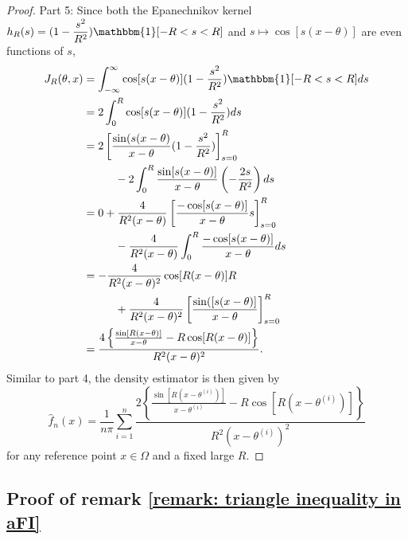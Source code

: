 \documentclass[%
 reprint,
 amsmath,amssymb,
 aps,
]{revtex4-2}
\begin{document}
\begin{proof}
    Part 5: Since both the Epanechnikov kernel $\displaystyle h_R(s) = (1 - \frac{s^2}{R^2}) \mathbbm{1}[-R < s < R]$ and $s \mapsto \cos[s(x - \theta)]$ are even functions of $s$,
    \begin{align*}
        J_R(\theta, x) & = \int_{-\infty}^\infty \cos[s(x - \theta)](1 - \frac{s^2}{R^2}) \mathbbm{1}[-R < s < R]ds \\
        & = 2 \int_0^R \cos[s(x - \theta)](1 - \frac{s^2}{R^2}) ds \\
        & = 2\left[\frac{\sin(s(x - \theta)}{x - \theta}(1 - \frac{s^2}{R^2}) \right]^R_{s = 0} \\
        & \hspace{1cm} -2\int_0^R \frac{\sin[s(x - \theta)]}{x - \theta}\left(-\frac{2s}{R^2} \right) ds \\
        & = 0 + \frac{4}{R^2(x - \theta)} \left[\frac{-\cos[s(x - \theta)]}{x - \theta}s \right]^R_{s = 0} \\
        & \hspace{1cm} - \frac{4}{R^2(x - \theta)} \int_0^R \frac{-\cos[s(x - \theta)]}{x - \theta} ds \\
        & = -\frac{4}{R^2(x - \theta)^2}\cos[R(x - \theta)]R \\
        & \hspace{1cm} + \frac{4}{R^2(x - \theta)^2}\left[\frac{\sin([s(x - \theta)]}{x - \theta} \right]^R_{s = 0} \\
        & = \frac{4\left\{\frac{\sin[R(x - \theta)]}{x - \theta} - R\cos[R(x - \theta)] \right\}}{R^2(x - \theta)^2}.
    \end{align*}
    Similar to part 4, the density estimator is then given by
    \begin{equation*}
        \hat{f}_n(x) = \frac{1}{n\pi} \sum_{i = 1}^n \frac{2\left\{\frac{\sin[R(x - \theta^{(i)})]}{x - \theta^{(i)}} - R\cos[R(x - \theta^{(i)})] \right\}}{R^2(x - \theta^{(i)})^2}
    \end{equation*}
    for any reference point $x \in \Omega$ and a fixed large $R$.
\end{proof}

\subsection{Proof of remark \ref{remark: triangle inequality in aFI}}
\end{document}
